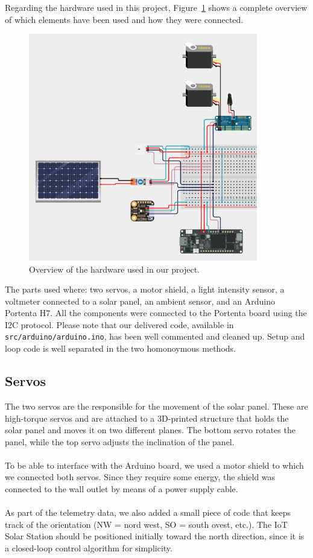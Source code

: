 Regarding the hardware used in this project, Figure~\ref{fig:circuit} shows a complete overview of which elements have been used and how they were connected.
\begin{figure}[h]
    \centering
    \includegraphics[width=10cm]{../assets/png/project-circuit}
    \caption{Overview of the hardware used in our project.}
    \label{fig:circuit}
\end{figure}
The parts used where: two servos, a motor shield, a light intensity sensor, a
voltmeter connected to a solar panel, an ambient sensor, and an Arduino Portenta
H7. All the components were connected to the Portenta board using the I2C
protocol. Please note that our delivered code, available in
\texttt{src/arduino/arduino.ino}, has been well commented and cleaned up. Setup
and loop code is well separated in the two homonoymous methods.

\subsection*{Servos}
The two servos are the responsible for the movement of the solar panel. These
are high-torque servos and are attached to a 3D-printed structure that holds the
solar panel and moves it on two different planes. The bottom servo rotates the
panel, while the top servo adjusts the inclination of the panel. \\ \\
To be able to interface with the Arduino board, we used a motor shield to which we connected both servos.
Since they require some energy, the shield was connected to the wall outlet by means of a power supply cable. \\ \\
As part of the telemetry data, we also added a small piece of code that keeps
track of the orientation (NW = nord west, SO = south ovest, etc.). The IoT Solar
Station should be positioned initially toward the north direction, since it is a
closed-loop control algorithm for simplicity.

